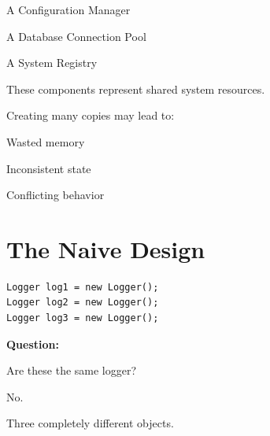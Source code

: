 \documentclass[11pt,a4paper]{book}
\begin{document}
A Configuration Manager


A Database Connection Pool


A System Registry


These components represent
shared system resources.


Creating many copies may lead to:


Wasted memory


Inconsistent state


Conflicting behavior


\section{The Naive Design}

\begin{verbatim}
Logger log1 = new Logger();
Logger log2 = new Logger();
Logger log3 = new Logger();
\end{verbatim}


\textbf{Question:}


Are these the same logger?


No.


Three completely different objects.

\end{document}
